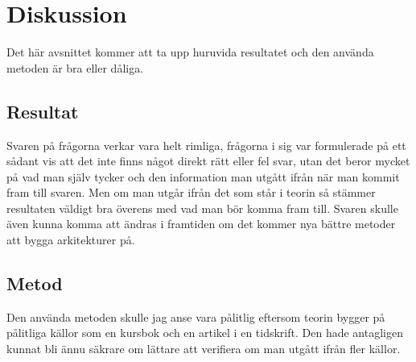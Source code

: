 \section{Diskussion}
Det här avsnittet kommer att ta upp huruvida resultatet och den använda metoden är bra eller dåliga.

\subsection{Resultat}
Svaren på frågorna verkar vara helt rimliga, frågorna i sig var formulerade på ett sådant vis att det inte finns något direkt rätt eller fel svar, utan det beror mycket på vad man själv tycker och den information man utgått ifrån när man kommit fram till svaren. Men om man utgår ifrån det som står i teorin så stämmer resultaten väldigt bra överens med vad man bör komma fram till.
\newline
\newline
Svaren skulle även kunna komma att ändras i framtiden om det kommer nya bättre metoder att bygga arkitekturer på.

\subsection{Metod}
Den använda metoden skulle jag anse vara pålitlig eftersom teorin bygger på pålitliga källor som en kursbok och en artikel i en tidskrift. Den hade antagligen kunnat bli ännu säkrare om lättare att verifiera om man utgått ifrån fler källor.

